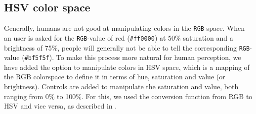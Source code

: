 	\subsection{HSV color space}
		Generally, humans are not good at manipulating colors in the \texttt{RGB}-space. 
		When an user is asked for the \texttt{RGB}-value of red (\texttt{\#ff0000}) at 50\% saturation and a brightness of 75\%, people will generally not be able to tell the corresponding \texttt{RGB}-value (\texttt{\#bf5f5f}).
		To make this process more natural for human perception, we have added the option to manipulate colors in HSV space, which is a mapping of the RGB colorspace to define it in terms of hue, saturation and value (or brightness).
		Controls are added to manipulate the saturation and value, both ranging from 0\% to 100\%.
		For this, we used the conversion function from RGB to HSV and vice versa, as described in \cite{telea2014data}.
